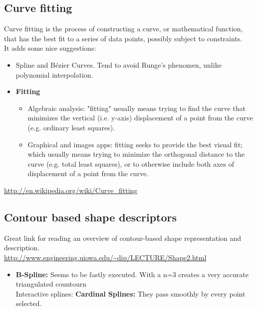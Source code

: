 \documentclass{article}
\begin{document}
\subsection{Curve fitting}
Curve fitting is the process of constructing a curve, or mathematical function, that has the best fit to a series of data points, possibly subject to constraints.\\
It adds some nice suggestions:
\begin{itemize}
  \begin{itemize}
  \item $y = ax^3 + bx^2 + cx + d$ In polynoms to fit curve the degree of 
    the polynom $(n)$ sets the number of\emph{ constraints} being fitted.
    Each constraint can be: a point, an angle, a curvature.
    \item \textbf{Runge's phenomenon}: high order polynomials can be highly oscillatory
  \end{itemize}
\item Spline and B\'ezier Curves. Tend to avoid Runge's phenomen, unlike
  polynomial interpolation.
\item \textbf{Fitting}
  \begin{itemize}
  \item Algebraic analysis: "fitting" usually means trying to find the curve that minimizes the vertical (i.e. y-axis) displacement of a point from the curve (e.g. ordinary least squares).
  \item Graphical and images apps: fitting seeks to provide the best visual fit; which usually means trying to minimize the orthogonal distance to the curve (e.g. total least squares), or to otherwise include both axes of displacement of a point from the curve.  
  \end{itemize}
\end{itemize}

\url{http://en.wikipedia.org/wiki/Curve_fitting}

\subsection{Contour based shape descriptors}
Great link for reading an overview of contour-based shape representation and
description.\\
\url{http://www.engineering.uiowa.edu/~dip/LECTURE/Shape2.html}\\

\begin{itemize}
\item \textbf{B-Spline: }Seems to be fastly executed. With a n=3 creates
  a very accurate triangulated countourn\\

Interactive splines: 
\textbf{Cardinal Splines: }They pass smoothly by every point selected.

\end{itemize}
\end{document}
